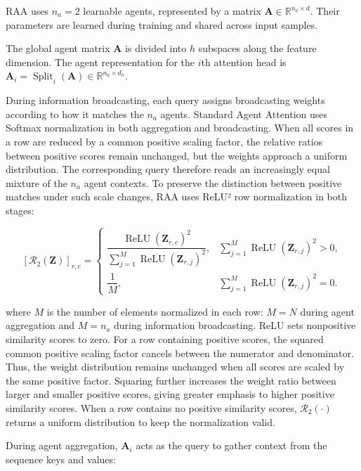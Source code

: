 RAA uses $n_a=2$ learnable agents, represented by a matrix $\mathbf A\in\mathbb R^{n_a\times d}$. Their parameters are learned during training and shared across input samples.

The global agent matrix $\mathbf A$ is divided into $h$ subspaces along the feature dimension. The agent representation for the $i$th attention head is $\mathbf A_i=\operatorname{Split}_i(\mathbf A)\in\mathbb R^{n_a\times d_h}$.

During information broadcasting, each query assigns broadcasting weights according to how it matches the $n_a$ agents. Standard Agent Attention uses Softmax normalization in both aggregation and broadcasting. When all scores in a row are reduced by a common positive scaling factor, the relative ratios between positive scores remain unchanged, but the weights approach a uniform distribution. The corresponding query therefore reads an increasingly equal mixture of the $n_a$ agent contexts. To preserve the distinction between positive matches under such scale changes, RAA uses ReLU² row normalization in both stages:

\begin{equation}
\left[\mathcal R_2(\mathbf Z)\right]_{r,c}
=
\begin{cases}
\dfrac{\operatorname{ReLU}(\mathbf Z_{r,c})^2}
{\sum_{j=1}^{M}\operatorname{ReLU}(\mathbf Z_{r,j})^2},
&
\sum_{j=1}^{M}\operatorname{ReLU}(\mathbf Z_{r,j})^2>0,\\[10pt]
\dfrac{1}{M},
&
\sum_{j=1}^{M}\operatorname{ReLU}(\mathbf Z_{r,j})^2=0.
\end{cases}
\label{eq:relu2_normalization}
\end{equation}

where $M$ is the number of elements normalized in each row: $M=N$ during agent aggregation and $M=n_a$ during information broadcasting. ReLU sets nonpositive similarity scores to zero. For a row containing positive scores, the squared common positive scaling factor cancels between the numerator and denominator. Thus, the weight distribution remains unchanged when all scores are scaled by the same positive factor. Squaring further increases the weight ratio between larger and smaller positive scores, giving greater emphasis to higher positive similarity scores. When a row contains no positive similarity scores, $\mathcal R_2(\cdot)$ returns a uniform distribution to keep the normalization valid.

During agent aggregation, $\mathbf A_i$ acts as the query to gather context from the sequence keys and values:

